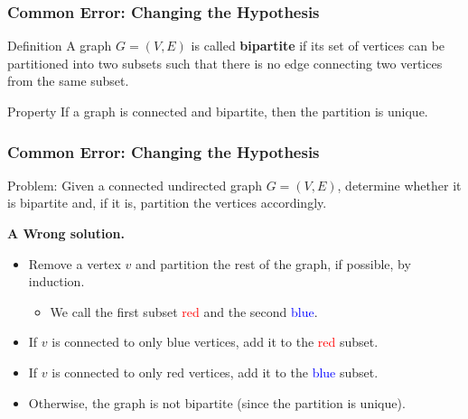 \documentclass{beamer}
\begin{document}
\begin{frame}%
\frametitle{Common Error: Changing the Hypothesis}

\scriptsize

\begin{block}{Definition}
A graph $G = (V, E)$ is called \textbf{bipartite} if its set of vertices can be partitioned into two subsets
such that there is no edge connecting two vertices from the same subset.
\end{block}


\begin{block}{Property}
If a graph is connected and bipartite, then the partition is unique.
\end{block}

\end{frame}


\begin{frame}%
\frametitle{Common Error: Changing the Hypothesis}

\begin{mdframed}[style=exampledefault]
Problem: Given a connected undirected graph $G = (V, E)$, determine whether it is bipartite and, if it is, partition
the vertices accordingly.
\end{mdframed}

\vspace{0.5cm}
\textbf{A Wrong solution.}

\begin{itemize}

\item Remove a vertex $v$ and partition the rest of the graph, if possible, by induction.
\begin{itemize}
\item We call the first subset \textcolor{red}{red} and the second \textcolor{blue}{blue}.
\end{itemize}

\item<3-> If $v$ is connected to only blue vertices, add it to the \textcolor{red}{red} subset.

\item<4-> If $v$ is connected to only red vertices, add it to the \textcolor{blue}{blue} subset.

\item<5-> Otherwise, the graph is not bipartite (since the partition is unique).

\end{itemize}

\end{frame}
\end{document}

